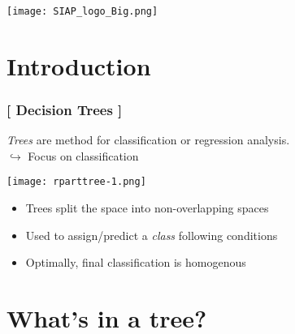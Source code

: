 \documentclass[xcolor=x11names,compress, handhouts]{beamer}
\renewcommand{\(}{\begin{columns}}
\renewcommand{\)}{\end{columns}}
\newcommand{\<}[1]{\begin{column}{#1}}
\renewcommand{\>}{\end{column}}
\begin{document}
\begin{frame}
\Large{ \color{siap}{Machine Learning for Official Statistics \& SDGs}}

\hspace{1cm}


\hspace{2cm}
\begin{center}

\texttt{[image: SIAP\_logo\_Big.png]}

\end{center}
\end{frame}



\section{Introduction}

\begin{frame} %

\frametitle{\textcolor{brique}{[ Decision Trees ]}}
\textit{Trees} are method for classification or regression analysis.\\
 $\hookrightarrow$ Focus on classification\\
\begin{center} \texttt{[image: rparttree-1.png]} \end{center}
\pause
\begin{itemize}
  \item Trees split the space into non-overlapping spaces
  \item Used to assign/predict a \textit{class} following conditions
  \item Optimally, final classification is homogenous
\end{itemize}
\end{frame}

\section{What's in a tree?}
\end{document}

